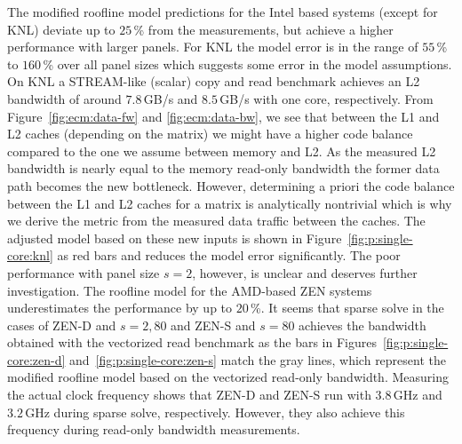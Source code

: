 The modified roofline model predictions for the Intel based systems (except for
KNL) deviate up to $25$\,\% from the measurements, but achieve a higher
performance with larger panels.
%
For KNL the model error is in the range of $55$\,\% to $160$\,\% over all panel
sizes which suggests some error in the model assumptions.
On KNL a STREAM-like (scalar) copy and read benchmark achieves an L2 bandwidth of
around $7.8$\,GB/s and $8.5$\,GB/s with one core,
respectively.
From Figure~\ref{fig:ecm:data-fw} and \ref{fig:ecm:data-bw}, we see that between the L1 and L2 caches (depending on
the matrix) we might have a higher code
balance compared to the one we assume between memory and L2.
As the measured L2 bandwidth is nearly equal to the memory read-only bandwidth
the former data path becomes the new bottleneck.
However, determining a priori the code balance between the L1 and L2 caches for a matrix
is analytically nontrivial which is why we derive the metric from the measured data
traffic between the caches.
The adjusted model based on these new inputs is shown in
Figure~\ref{fig:p:single-core:knl} as red bars and reduces the model error
significantly.
%
The poor performance with panel size $s = 2$, however, is unclear and deserves
further investigation. 
%
%
%
The roofline model for the AMD-based ZEN systems underestimates the
performance by up to $20$\,\%.
It seems that sparse solve in the cases of ZEN-D and $s=2, 80$ and ZEN-S and $s=80$
achieves the bandwidth obtained with the vectorized read benchmark as the bars
in Figures~\ref{fig:p:single-core:zen-d} and~\ref{fig:p:single-core:zen-s} match
the gray lines, which represent the modified roofline model based on the
vectorized read-only bandwidth.
Measuring the actual clock frequency shows that ZEN-D and ZEN-S run with
$3.8$\,GHz and $3.2$\,GHz during sparse solve, respectively.
However, they also achieve this frequency during read-only bandwidth
measurements.
%

